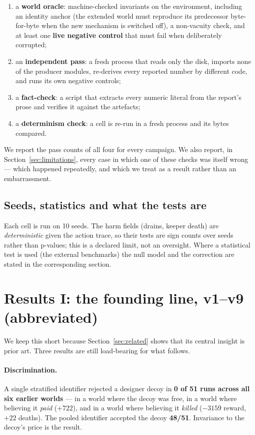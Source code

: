 \documentclass[11pt]{article}
\begin{document}
\begin{enumerate}[leftmargin=1.4em,itemsep=2pt]
\item a \textbf{world oracle}: machine-checked invariants on the environment,
including an identity anchor (the extended world must reproduce its predecessor
byte-for-byte when the new mechanism is switched off), a non-vacuity check, and at
least one \textbf{live negative control} that must fail when deliberately corrupted;
\item an \textbf{independent pass}: a fresh process that reads only the disk, imports
none of the producer modules, re-derives every reported number by different code, and
runs its own negative controls;
\item a \textbf{fact-check}: a script that extracts every numeric literal from the
report's prose and verifies it against the artefacts;
\item a \textbf{determinism check}: a cell is re-run in a fresh process and its bytes
compared.
\end{enumerate}

We report the pass counts of all four for every campaign. We also report, in
Section~\ref{sec:limitations}, every case in which one of these checks was itself
wrong --- which happened repeatedly, and which we treat as a result rather than an
embarrassment.

\subsection{Seeds, statistics and what the tests are}

Each cell is run on 10 seeds. The harm fields (drains, keeper death) are
\emph{deterministic} given the action trace, so their tests are sign counts over
seeds rather than p-values; this is a declared limit, not an oversight. Where a
statistical test is used (the external benchmarks) the null model and the correction
are stated in the corresponding section.

\section{Results I: the founding line, v1--v9 (abbreviated)}
\label{sec:v1v9}

We keep this short because Section~\ref{sec:related} shows that its central insight is
prior art. Three results are still load-bearing for what follows.

\paragraph{Discrimination.} A single stratified identifier rejected a designer decoy
in \textbf{0 of 51 runs across all six earlier worlds} --- in a world where the decoy
was free, in a world where believing it \emph{paid} ($+722$), and in a world where
believing it \emph{killed} ($-3159$ reward, $+22$ deaths). The pooled identifier
accepted the decoy \textbf{48/51}. Invariance to the decoy's price is the result.
\end{document}
